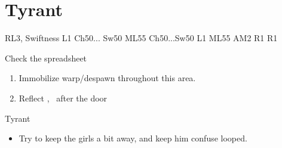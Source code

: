 \chapter{Tyrant}

\begin{liscense}
RL3, Swiftness					
L1					Ch50... Sw50
					ML55
				Ch50...Sw50	L1
				ML55	
AM2				R1	R1

Check the spreadsheet
\end{liscense}
\begin{gambit}
\begin{itemize}
\end{itemize}
\end{gambit}
\begin{enumerate}
\item Immobilize warp/despawn throughout this area.
\item Reflect \ashe, \penelo\ after the door
\end{enumerate}
\begin{battle}{Tyrant}
\begin{itemize}
\penelof Dispel
\vaanf Once it's charged a bit, start spamming Confuse
\item Try to keep the girls a bit away, and keep him confuse looped.
\end{itemize}
\end{battle}
